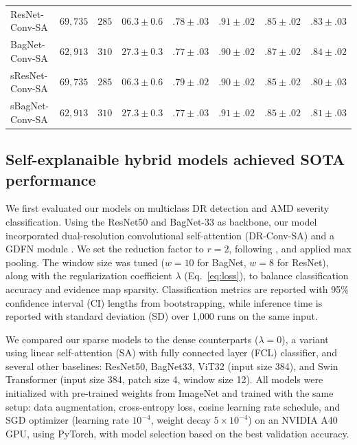 \documentclass[runningheads]{llncs}
\begin{document}
\begin{table}[b]
\begin{tabular}{l |c c c| c c | c c}
                ResNet-Conv-SA & $69,735$ & $285$ & $06.3 \pm 0.6$ & $.78 \pm .03$ & $.91 \pm .02$ & $.85 \pm .02$ & $.83 \pm .03$  \\
                BagNet-Conv-SA & $62,913$ & $310$ & $27.3 \pm 0.3$ & $.77 \pm.03$ & $.90 \pm .02$ & $\mathbf{.87 \pm .02}$ & $\mathbf{.84 \pm .02}$ \\
                \hline
                sResNet-Conv-SA & $69,735$ & $285$ & $06.3 \pm 0.6$ & $\mathbf{.79 \pm .02}$ & $.90 \pm .02$ & $.85 \pm .02$ & $.80 \pm .03$  \\
                sBagNet-Conv-SA & $62,913$ & $310$ & $ 27.3 \pm 0.3$ & $.77 \pm .03$ & $.91 \pm .02$ & $.85 \pm .02$ & $.81 \pm .03$ 
            \end{tabular}
            \label{tab:classification_results}
        \end{table} 

    \subsection{Self-explanaible hybrid models achieved SOTA performance} %
        We first evaluated our models on multiclass DR detection and AMD severity classification. Using the ResNet50 and BagNet-33 as backbone, our model incorporated dual-resolution convolutional self-attention (DR-Conv-SA) and a GDFN module \cite{zamir2022restormer}. We set the reduction factor to $r=2$, following \cite{ilyas2024hybrid}, and applied max pooling. The window size was tuned ($w=10$ for BagNet, $w=8$ for ResNet), along with the regularization coefficient $\lambda$ (Eq.~\ref{eq:loss}), to balance classification accuracy and evidence map sparsity. Classification metrics are reported with 95\% confidence interval (CI) lengths from bootstrapping, while inference time is reported with standard deviation (SD) over 1,000 runs on the same input.
        
        We compared our sparse models to the dense counterparts ($\lambda = 0$), a variant using linear self-attention (SA) with fully connected layer (FCL) classifier, and several other baselines: ResNet50, BagNet33, ViT32 (input size 384), and Swin Transformer (input size 384, patch size 4, window size 12). 
        All models were initialized with pre-trained weights from ImageNet and trained with the same setup: data augmentation, cross-entropy loss, cosine learning rate schedule, and SGD optimizer (learning rate $10^{-4}$, weight decay $5\times 10^{-4}$) %
        on an NVIDIA A40 GPU, using PyTorch, with model selection based on the best validation accuracy. 
\end{document}
